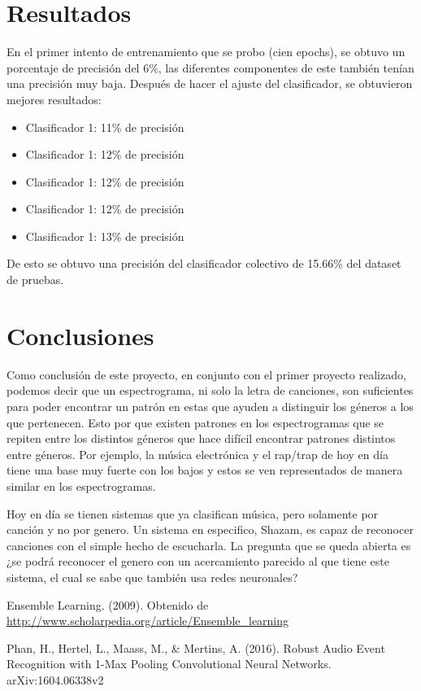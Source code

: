 \documentclass[spanish,11pt,letterpaper]{article}
\begin{document}
\section{Resultados}

En el primer intento de entrenamiento que se probo (cien epochs), se obtuvo un porcentaje de precisión del 6\%, las diferentes componentes de este también tenían una precisión muy baja. Después de hacer el ajuste del clasificador, se obtuvieron mejores resultados:
\begin{itemize}
\item Clasificador 1: 11\% de precisión
\item Clasificador 1: 12\% de precisión
\item Clasificador 1: 12\% de precisión
\item Clasificador 1: 12\% de precisión
\item Clasificador 1: 13\% de precisión
\end{itemize}

De esto se obtuvo una precisión del clasificador colectivo de 15.66\% del dataset de pruebas.


\section{Conclusiones}

Como conclusión de este proyecto, en conjunto con el primer proyecto realizado, podemos decir que un espectrograma, ni solo la letra de canciones, son suficientes para poder encontrar un patrón en estas que ayuden a distinguir los géneros a los que pertenecen. Esto por que existen patrones en los espectrogramas que se repiten entre los distintos géneros que hace difícil encontrar patrones distintos entre géneros. Por ejemplo, la música electrónica y el rap/trap de hoy en día tiene una base muy fuerte con los bajos y estos se ven representados de manera similar en los espectrogramas.

Hoy en día se tienen sistemas que ya clasifican música, pero solamente por canción y no por genero. Un sistema en especifico, Shazam, es capaz de reconocer canciones con el simple hecho de escucharla. La pregunta que se queda abierta es ¿se podrá reconocer el genero con un acercamiento parecido al que tiene este sistema, el cual se sabe que también usa redes neuronales?



\begin{thebibliography}{9}
Ensemble Learning. (2009). Obtenido de
\url{http://www.scholarpedia.org/article/Ensemble_learning}

Phan, H., Hertel, L., Maass, M., \& Mertins, A. (2016).
Robust Audio Event Recognition with 1-Max Pooling Convolutional Neural Networks.
arXiv:1604.06338v2

\end{thebibliography}
\end{document}
